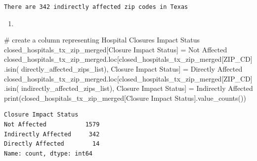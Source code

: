 \documentclass[
  letterpaper,
  DIV=11,
  numbers=noendperiod]{scrartcl}
\newenvironment{Shaded}{\begin{snugshade}}{\end{snugshade}}
\newcommand{\BuiltInTok}[1]{\textcolor[rgb]{0.00,0.23,0.31}{#1}}
\newcommand{\CommentTok}[1]{\textcolor[rgb]{0.37,0.37,0.37}{#1}}
\newcommand{\NormalTok}[1]{\textcolor[rgb]{0.00,0.23,0.31}{#1}}
\newcommand{\OperatorTok}[1]{\textcolor[rgb]{0.37,0.37,0.37}{#1}}
\newcommand{\StringTok}[1]{\textcolor[rgb]{0.13,0.47,0.30}{#1}}
\providecommand{\tightlist}{%
  \setlength{\itemsep}{0pt}\setlength{\parskip}{0pt}}\usepackage{longtable,booktabs,array}
\begin{document}
\begin{verbatim}
There are 342 indirectly affected zip codes in Texas
\end{verbatim}

\begin{enumerate}
\def\labelenumi{\arabic{enumi}.}
\setcounter{enumi}{3}
\tightlist
\item
\end{enumerate}

\begin{Shaded}
\begin{Highlighting}[]
\CommentTok{\# create a column representing Hospital Closures Impact Status}
\NormalTok{closed\_hospitals\_tx\_zip\_merged[}\StringTok{\textquotesingle{}Closure Impact Status\textquotesingle{}}\NormalTok{] }\OperatorTok{=} \StringTok{\textquotesingle{}Not Affected\textquotesingle{}}
\NormalTok{closed\_hospitals\_tx\_zip\_merged.loc[closed\_hospitals\_tx\_zip\_merged[}\StringTok{\textquotesingle{}ZIP\_CD\textquotesingle{}}\NormalTok{].isin(}
\NormalTok{    directly\_affected\_zips\_list), }\StringTok{\textquotesingle{}Closure Impact Status\textquotesingle{}}\NormalTok{] }\OperatorTok{=} \StringTok{\textquotesingle{}Directly Affected\textquotesingle{}}
\NormalTok{closed\_hospitals\_tx\_zip\_merged.loc[closed\_hospitals\_tx\_zip\_merged[}\StringTok{\textquotesingle{}ZIP\_CD\textquotesingle{}}\NormalTok{].isin(}
\NormalTok{    indirectly\_affected\_zips\_list), }\StringTok{\textquotesingle{}Closure Impact Status\textquotesingle{}}\NormalTok{] }\OperatorTok{=} \StringTok{\textquotesingle{}Indirectly Affected\textquotesingle{}}
\BuiltInTok{print}\NormalTok{(closed\_hospitals\_tx\_zip\_merged[}\StringTok{\textquotesingle{}Closure Impact Status\textquotesingle{}}\NormalTok{].value\_counts())}
\end{Highlighting}
\end{Shaded}

\begin{verbatim}
Closure Impact Status
Not Affected           1579
Indirectly Affected     342
Directly Affected        14
Name: count, dtype: int64
\end{verbatim}
\end{document}
